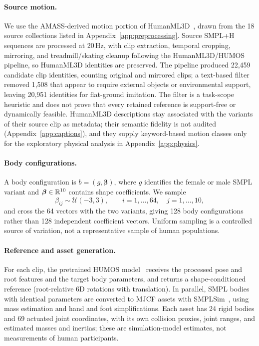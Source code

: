 \paragraph{Source motion.}
We use the AMASS-derived motion portion of HumanML3D~\cite{amass,humanml3d},
drawn from the 18 source collections listed in
Appendix~\ref{app:preprocessing}. Source SMPL+H sequences are processed at
20\,Hz, with clip extraction, temporal cropping, mirroring, and
treadmill/skating cleanup following the HumanML3D/HUMOS pipeline, so
HumanML3D identities are preserved. The pipeline produced 22,459 candidate clip
identities, counting original and mirrored clips; a text-based filter removed
1,508 that appear to require external objects or environmental support, leaving
20,951 identities for flat-ground imitation. The filter is a task-scope
heuristic and does not prove that every retained reference is support-free or
dynamically feasible. HumanML3D descriptions stay associated with the variants
of their source clip as metadata; their semantic fidelity is not audited
(Appendix~\ref{app:captions}), and they supply keyword-based motion classes only
for the exploratory physical analysis in Appendix~\ref{app:physics}.

\paragraph{Body configurations.}
A body configuration is $b=(g,\boldsymbol{\beta})$, where $g$ identifies the
female or male SMPL variant and $\boldsymbol{\beta}\in\mathbb{R}^{10}$ contains shape
coefficients. We sample
\begin{equation}
    \beta_{ij}\sim\mathcal{U}(-3,3),\qquad
    i=1,\ldots,64,\quad j=1,\ldots,10,
    \label{eq:shape_sampling}
\end{equation}
and cross the 64 vectors with the two variants, giving 128 body configurations
rather than 128 independent coefficient vectors. Uniform sampling is a
controlled source of variation, not a representative sample of human
populations.

\paragraph{Reference and asset generation.}
For each clip, the pretrained HUMOS model~\cite{humos} receives the processed
pose and root features and the target body parameters, and returns a
shape-conditioned reference (root-relative 6D rotations with translation). In
parallel, SMPL bodies~\cite{smpl} with identical parameters are converted to
MJCF assets with SMPLSim~\cite{smplsim}, using mass estimation and hand and foot
simplifications. Each asset has 24 rigid bodies and 69 actuated joint
coordinates, with its own collision proxies, joint ranges, and estimated masses
and inertias; these are simulation-model estimates, not measurements of human
participants.

